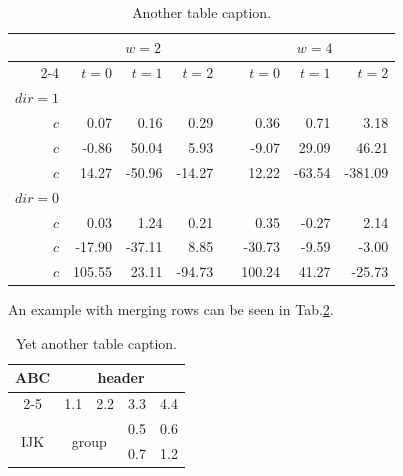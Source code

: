 \begin{table}[!htb]
  \caption{Another table caption.}
  \label{tab:multipleColumns}
  \centering
  \renewcommand{\arraystretch}{1.2} %
  \begin{tabular}{@{}rrrrcrrr@{}} %
    \toprule
      & \multicolumn{3}{c}{$w = 2$} & \phantom{abc} & \multicolumn{3}{c}{$w = 4$} \\
    \cmidrule{2-4}
    \cmidrule{6-8}
      & $t=0$ & $t=1$ & $t=2$ && $t=0$ & $t=1$ & $t=2$ \\
    \midrule
      $dir=1$
      \\
      $c$ &  0.07 &  0.16 &  0.29 &&  0.36 &  0.71 &   3.18 \\
      $c$ & -0.86 & 50.04 &  5.93 && -9.07 & 29.09 &  46.21 \\
      $c$ & 14.27 &-50.96 &-14.27 && 12.22 &-63.54 &-381.09 \\
      $dir=0$
      \\
      $c$ &  0.03 &  1.24 &  0.21 &&  0.35 & -0.27 &  2.14 \\
      $c$ &-17.90 &-37.11 &  8.85 &&-30.73 & -9.59 & -3.00 \\
      $c$ &105.55 & 23.11 &-94.73 &&100.24 & 41.27 &-25.73 \\
    \bottomrule
  \end{tabular}
\end{table}

An example with merging rows can be seen in Tab.\ref{tab:multipleRows}.

\begin{table}[!htb]
  \caption{Yet another table caption.}
  \label{tab:multipleRows}
  \renewcommand{\arraystretch}{1.2} %
  \centering
  \begin{tabular}{ccccc}
    \toprule
      \multirow{2}{*}{ABC} & \multicolumn{4}{c}{header} \\
      \cmidrule{2-5} & 1.1 & 2.2 & 3.3 & 4.4 \\
    \midrule
      \multirow{2}{*}{IJK} & \multicolumn{2}{c}{\multirow{2}{*}{group}} & 0.5 & 0.6 \\
      \cmidrule{4-5}       & \multicolumn{2}{c}{}                       & 0.7 & 1.2 \\
    \bottomrule
  \end{tabular}
\end{table}

